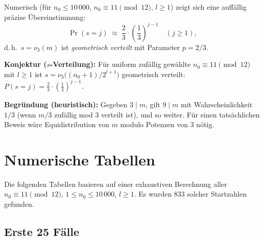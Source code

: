\documentclass[12pt,a4paper]{article}
\newcommand{\viii}{\nu_3}
\begin{document}
Numerisch (für $n_0 \leq 10\,000$, $n_0 \equiv 11 \pmod{12}$, $l \geq 1$)
zeigt sich eine auffällig präzise Übereinstimmung:
\[
  \Pr(s = j) \;\approx\; \frac{2}{3} \cdot \left(\frac{1}{3}\right)^{j-1}
  \quad (j \geq 1),
\]
d.\,h.\ $s = \viii(m)$ ist \emph{geometrisch verteilt} mit Parameter $p = 2/3$.

\begin{tcolorbox}[konj]
\textbf{Konjektur ($s$-Verteilung):}
Für uniform zufällig gewählte $n_0 \equiv 11 \pmod{12}$ mit $l \geq 1$
ist $s = \viii\!\bigl((n_0+1)/2^{l+1}\bigr)$ geometrisch verteilt:
$P(s = j) = \tfrac{2}{3} \cdot \left(\tfrac{1}{3}\right)^{j-1}$.

\smallskip
\textbf{Begründung (heuristisch):}
Gegeben $3 \mid m$, gilt $9 \mid m$ mit Wahrscheinlichkeit $1/3$
(wenn $m/3$ zufällig mod $3$ verteilt ist), und so weiter.
Für einen tatsächlichen Beweis wäre Equidistribution von $m$
modulo Potenzen von $3$ nötig.
\end{tcolorbox}

\section{Numerische Tabellen}
\label{sec:numerik}

Die folgenden Tabellen basieren auf einer exhaustiven Berechnung
aller $n_0 \equiv 11 \pmod{12}$, $1 \leq n_0 \leq 10\,000$, $l \geq 1$.
Es wurden $833$ solcher Startzahlen gefunden.

\subsection{Erste 25 Fälle}
\end{document}
